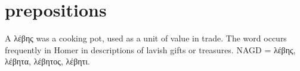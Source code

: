 \documentclass[12pt,openany]{book}
\newenvironment{notes}{\vfill\scriptsize\begin{flushright}}{\end{flushright}}
\newcommand{\fig}[1]{\begin{center}\end{center}}
\begin{document}

\chapter{prepositions}

\fig{prepositions/prepositions.svg}

\begin{notes}
A λέβης was a cooking pot, used as a unit of value in trade. The word occurs frequently in Homer in descriptions
of lavish gifts or treasures. NAGD = λέβης, λέβητα, λέβητος, λέβητι.
\end{notes}
\end{document}
